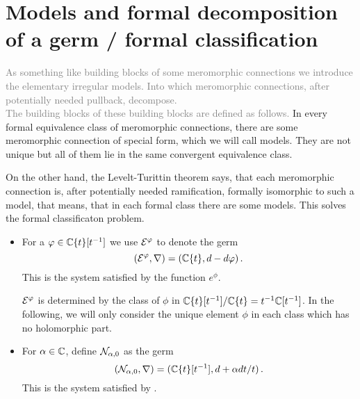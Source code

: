 \section{Models and formal decomposition of a germ / formal classification}
\begin{paracol}{2}
\switchcolumn[0]\noindent
  \textcolor{gray}{As something like building blocks of some meromorphic
    connections we introduce the elementary irregular models. Into which
    meromorphic connections, after potentially needed pullback, decompose.
    \\The building blocks of these building blocks are defined as follows.}
\switchcolumn[1]\noindent
  In every formal equivalence class of meromorphic connections, there are some
  meromorphic connection of special form, which we will call models. They are
  not unique but all of them lie in the same convergent equivalence class.

  On the other hand, the Levelt-Turittin theorem says,
  that  each meromorphic connection is, after potentially needed ramification,
  formally isomorphic to such a model, that means, that in each formal class
  there are some models.
  This solves the formal classificaton problem.
\end{paracol}
\begin{defn}
  \begin{itemize}
    \item For a $\varphi\in\mathbb{C}\{t\}[t^{-1}]$ we use $\mathcal{E}^{\varphi}$ to denote the germ
      \[
        (\mathcal{E}^{\varphi},\nabla)=(\mathbb{C}\{t\},d-d\varphi)\,.
      \]
      This is the system satisfied by the function $e^\phi$.
      \begin{cor}
        $\mathcal{E}^\varphi$ is determined by the class of $\phi$ in
        $\mathbb{C}\{t\}[t^{-1}]/\mathbb{C}\{t\}=t^{-1}\mathbb{C}[t^{-1}]$. In the following, we will
        only consider the unique element $\phi$ in each class which has no
        holomorphic part.
      \end{cor}
    \item For $\alpha\in\mathbb{C}$, define $\mathcal{N}_{\alpha,0}$ as the germ
      \[
        (\mathcal{N}_{\alpha,0},\nabla)=(\mathbb{C}\{t\}[t^{-1}],d+\alpha dt/t)\,.
      \]
      This is the system satisfied by \TODO{}.
  \end{itemize}
\end{defn}
